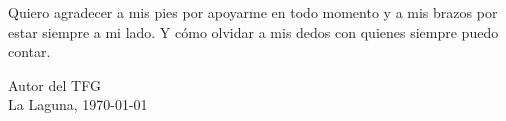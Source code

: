 \ack



Quiero agradecer a mis pies por apoyarme en todo momento y a mis brazos por estar siempre a mi lado. Y c\'omo olvidar a mis dedos con quienes siempre puedo contar.


\vfil
\begin{flushright}
\hfill Autor del TFG\\
La Laguna, \today
\end{flushright}
